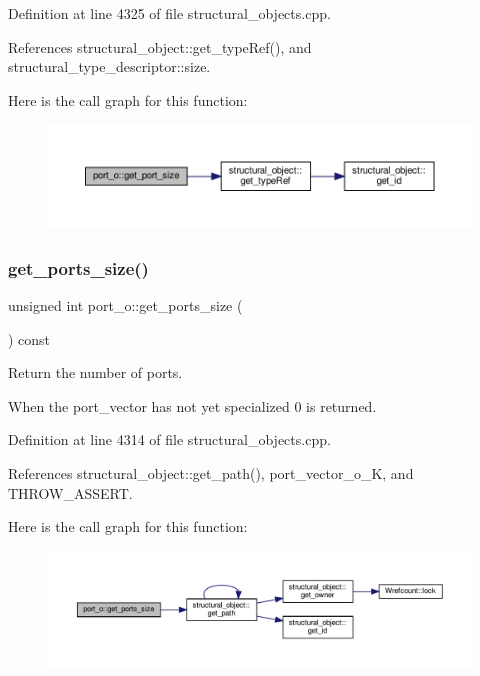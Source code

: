 Definition at line 4325 of file structural\+\_\+objects.\+cpp.



References structural\+\_\+object\+::get\+\_\+type\+Ref(), and structural\+\_\+type\+\_\+descriptor\+::size.

Here is the call graph for this function\+:
\nopagebreak
\begin{figure}[H]
\begin{center}
\leavevmode
\includegraphics[width=350pt]{df/d75/structport__o_a7c8f3f6dab60cc5d4a81adce48a73d0c_cgraph}
\end{center}
\end{figure}
\mbox{\label{structport__o_a7b0bbdeec34d5d326f84af405c0d1024}} 
\subsubsection{\texorpdfstring{get\+\_\+ports\+\_\+size()}{get\_ports\_size()}}
{\footnotesize\ttfamily unsigned int port\+\_\+o\+::get\+\_\+ports\+\_\+size (\begin{DoxyParamCaption}{ }\end{DoxyParamCaption}) const}



Return the number of ports. 

When the port\+\_\+vector has not yet specialized 0 is returned. 

Definition at line 4314 of file structural\+\_\+objects.\+cpp.



References structural\+\_\+object\+::get\+\_\+path(), port\+\_\+vector\+\_\+o\+\_\+K, and T\+H\+R\+O\+W\+\_\+\+A\+S\+S\+E\+RT.

Here is the call graph for this function\+:
\nopagebreak
\begin{figure}[H]
\begin{center}
\leavevmode
\includegraphics[width=350pt]{df/d75/structport__o_a7b0bbdeec34d5d326f84af405c0d1024_cgraph}
\end{center}
\end{figure}
\mbox{\label{structport__o_ae67edaf278daf791ec69b9eb59f5f2df}} 
